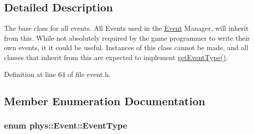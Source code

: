 \subsection{Detailed Description}
The base class for all events. All Events used in the \hyperlink{classphys_1_1Event}{Event} Manager, will inherit from this. While not absolutely required by the game programmer to write their own events, it it could be useful. Instances of this class cannot be made, and all classes that inherit from this are expected to implement \hyperlink{classphys_1_1Event_ac2c0623a6bc399e62f4b9fb2c022ea73}{getEventType()}. 

Definition at line 64 of file event.h.

\subsection{Member Enumeration Documentation}
\hypertarget{classphys_1_1Event_af5fdbb3e08d8e578d58770fbc606fda7}{
\subsubsection[{EventType}]{\setlength{\rightskip}{0pt plus 5cm}enum {\bf phys::Event::EventType}}}
\label{d5/dcb/classphys_1_1Event_af5fdbb3e08d8e578d58770fbc606fda7}
